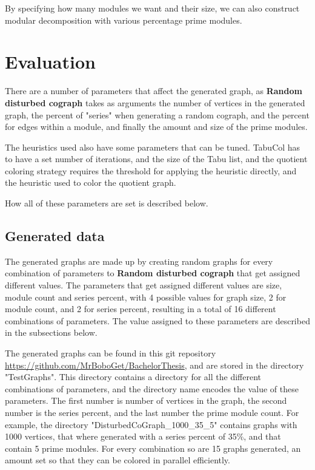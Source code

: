 \documentclass[a4paper]{article}
\begin{document}
By specifying how many modules we want and their size, we
can also construct modular decomposition with various percentage prime modules.

\section{Evaluation} 
\label{sec:Evaluation} 

There are a number of parameters that affect the generated graph, as
\textbf{Random disturbed cograph} takes as arguments the number of vertices in
the generated graph, the percent of "series" when generating a random cograph,
and the percent for edges within a module, and finally the amount and size of
the prime modules. 

The heuristics used also have some parameters that can be tuned. TabuCol has to
have a set number of iterations, and the size of the Tabu list, and the quotient
coloring strategy requires the threshold for applying the heuristic directly,
and the heuristic used to color the quotient graph.


How all of these parameters are set is described below.

\subsection{Generated data}

The generated graphs are made up by creating random graphs for every
combination of parameters to \textbf{Random disturbed cograph} that get assigned
different values. The parameters that get assigned different values are size,
module count and series percent, with 4 possible values for graph size, 2 for
module count, and 2 for series percent, resulting in a total of 16 different
combinations of parameters. The value assigned to these parameters are described
in the subsections below.

The generated graphs can be found in this git repository
\url{https://github.com/MrBoboGet/BachelorThesis}, and are stored in the
directory "TestGraphs". This directory contains a directory for all the different
combinations of parameters, and the directory name encodes the value of these
parameters. The first number is number of vertices in the graph, the second
number is the series percent, and the last number the prime module count.
For example, the directory "DisturbedCoGraph\_1000\_35\_5" contains graphs with 
1000 vertices, that where generated with a series percent of 35\%, and that
contain 5 prime modules. For every combination so are 15 graphs generated, 
an amount set so that they can be colored in parallel efficiently.
\end{document}
